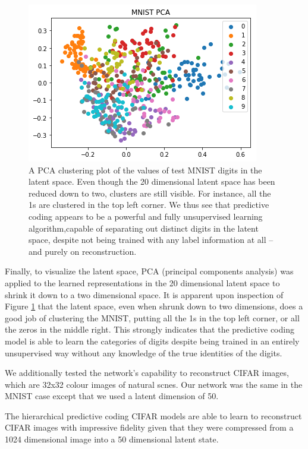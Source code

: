 \begin{figure}[H]
\centering
\includegraphics[scale=0.6]{chapter_3_figures/mnist_pca.png}
\caption{A PCA clustering plot of the values of test MNIST digits in the latent space. Even though the 20 dimensional latent space has been reduced down to two, clusters are still visible. For instance, all the 1s are clustered in the top left corner. We thus see that predictive coding appears to be a powerful and fully unsupervised learning algorithm,capable of separating out distinct digits in the latent space, despite not being trained with any label information at all -- and purely on reconstruction.}
\label{PCA_figure}
\end{figure}

Finally, to visualize the latent space, PCA (principal components analysis) was applied to the learned representations in the 20 dimensional latent space to shrink it down to a two dimensional space. It is apparent upon inspection of Figure \ref{PCA_figure} that the latent space, even when shrunk down to two dimensions, does a good job of clustering the MNIST, putting all the 1s in the top left corner, or all the zeros in the middle right. This strongly indicates that the predictive coding model is able to learn the categories of digits despite being trained in an entirely unsupervised way without any knowledge of the true identities of the digits.

We additionally tested the network's capability to reconstruct CIFAR images, which are 32x32 colour images of natural scnes. Our network was the same in the MNIST case except that we used a latent dimension of 50. 

The hierarchical predictive coding CIFAR models are able to learn to reconstruct CIFAR images with impressive fidelity given that they were compressed from a 1024 dimensional image into a 50 dimensional latent state.

